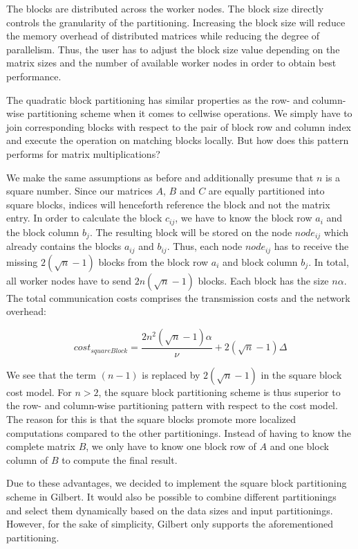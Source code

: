 The blocks are distributed across the worker nodes.
The block size directly controls the granularity of the partitioning.
Increasing the block size will reduce the memory overhead of distributed matrices while reducing the degree of parallelism.
Thus, the user has to adjust the block size value depending on the matrix sizes and the number of available worker nodes in order to obtain best performance.

The quadratic block partitioning has similar properties as the row- and column-wise partitioning scheme when it comes to cellwise operations.
We simply have to join corresponding blocks with respect to the pair of block row and column index and execute the operation on matching blocks locally.
But how does this pattern performs for matrix multiplications?

We make the same assumptions as before and additionally presume that $n$ is a square number.
Since our matrices $A$, $B$ and $C$ are equally partitioned into square blocks, indices will henceforth reference the block and not the matrix entry.
In order to calculate the block $c_{ij}$, we have to know the block row $a_{i}$ and the block column $b_{j}$.
The resulting block will be stored on the node $node_{ij}$ which already contains the blocks $a_{ij}$ and $b_{ij}$.
Thus, each node $node_{ij}$ has to receive the missing $2\left(\sqrt{n}-1\right)$ blocks from the block row $a_{i}$ and block column $b_{j}$.
In total, all worker nodes have to send $2n\left(\sqrt{n}-1\right)$ blocks.
Each block has the size $n\alpha$.
The total communication costs comprises the transmission costs and the network overhead:

\begin{displaymath}
	cost_{squareBlock} = \frac{2n^2\left(\sqrt{n}-1\right)\alpha}{\nu} + 2\left(\sqrt{n}-1\right)\Delta
\end{displaymath}

We see that the term $(n-1)$ is replaced by $2\left(\sqrt{n}-1\right)$ in the square block cost model.
For $n>2$, the square block partitioning scheme is thus superior to the row- and column-wise partitioning pattern with respect to the cost model.
The reason for this is that the square blocks promote more localized computations compared to the other partitionings.
Instead of having to know the complete matrix $B$, we only have to know one block row of $A$ and one block column of $B$ to compute the final result.

Due to these advantages, we decided to implement the square block partitioning scheme in Gilbert.
It would also be possible to combine different partitionings and select them dynamically based on the data sizes and input partitionings.
However, for the sake of simplicity, Gilbert only supports the aforementioned partitioning.

